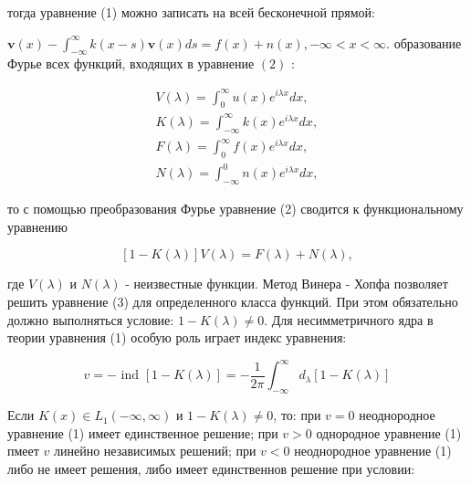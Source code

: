 \documentclass[10pt]{article}
\begin{document}
тогда уравнение (1) можно записать на всей бесконечной прямой:



$\boldsymbol{v}(x)-\int_{-\infty}^{\infty} k(x-s) \boldsymbol{v}(x) d s=f(x)+n(x),-\infty<x<\infty$. образование Фурье всех функций, входящих в уравнение $(2)$ :



\[

\begin{gathered}

V(\lambda)=\int_{0}^{\infty} u(x) e^{i \lambda x} d x, \\

K(\lambda)=\int_{-\infty}^{\infty} k(x) e^{i \lambda x} d x, \\

F(\lambda)=\int_{0}^{\infty} f(x) e^{i \lambda x} d x, \\

N(\lambda)=\int_{-\infty}^{0} n(x) e^{i \lambda x} d x,

\end{gathered}

\]



то с помощью преобразования Фурье уравнение (2) сводится к функциональному уравнению



\[

[1-K(\lambda)] V(\lambda)=F(\lambda)+N(\lambda),

\]



где $V(\lambda)$ и $N(\lambda)$ - неизвестные функции. Метод Винера - Хопфа позволяет решить уравнение (3) для определенного класса функций. При этом обязательно должно выполняться условие: $1-K(\lambda) \neq 0$. Для несимметричного ядра в теории уравнения (1) особую роль играет индекс уравнения:



\[

v=- \text { ind }[1-K(\lambda)]=-\frac{1}{2 \pi} \int_{-\infty}^{\infty} d_{\lambda}[1-K(\lambda)]

\]



Если $K(x) \in L_{1}(-\infty, \infty)$ и $1-K(\lambda) \neq 0$, то: при $v=0$ неоднородное уравнение (1) имеет единственное решение; при $v>0$ однородное уравнение (1) пмеет $v$ линейно независимых решений; при $v<0$ неоднородное уравнение (1) либо не имеет решения, либо имеет единственнов решение при условии:
\end{document}
